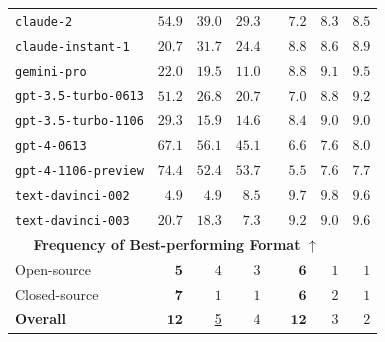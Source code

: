 \begin{table}[bpth]
\begin{minipage}{0.58\textwidth}
\begin{adjustbox}{max width=\textwidth}
\begin{tabular}{@{} l rrr  m{0.01em}  rrr @{}}
\texttt{claude-2}                  &     $\mathbf{54.9}$ &  \underline{$39.0$} &              $29.3$ &&     $\mathbf{7.2}$ &   \underline{$8.3$} &               $8.5$ \\
\texttt{claude-instant-1}          &              $20.7$ &     $\mathbf{31.7}$ &  \underline{$24.4$} &&  \underline{$8.8$} &      $\mathbf{8.6}$ &               $8.9$ \\
\texttt{gemini-pro}                &     $\mathbf{22.0}$ &  \underline{$19.5$} &              $11.0$ &&     $\mathbf{8.8}$ &   \underline{$9.1$} &               $9.5$ \\
\texttt{gpt-3.5-turbo-0613}        &     $\mathbf{51.2}$ &  \underline{$26.8$} &              $20.7$ &&     $\mathbf{7.0}$ &   \underline{$8.8$} &               $9.2$ \\
\texttt{gpt-3.5-turbo-1106}        &     $\mathbf{29.3}$ &  \underline{$15.9$} &              $14.6$ &&     $\mathbf{8.4}$ &   \underline{$9.0$} &   \underline{$9.0$} \\
\texttt{gpt-4-0613}                &     $\mathbf{67.1}$ &  \underline{$56.1$} &              $45.1$ &&     $\mathbf{6.6}$ &   \underline{$7.6$} &               $8.0$ \\
\texttt{gpt-4-1106-preview}        &     $\mathbf{74.4}$ &              $52.4$ &  \underline{$53.7$} &&     $\mathbf{5.5}$ &   \underline{$7.6$} &               $7.7$ \\
\texttt{text-davinci-002}          &   \underline{$4.9$} &   \underline{$4.9$} &      $\mathbf{8.5}$ &&  \underline{$9.7$} &               $9.8$ &      $\mathbf{9.6}$ \\
\texttt{text-davinci-003}          &     $\mathbf{20.7}$ &  \underline{$18.3$} &               $7.3$ &&  \underline{$9.2$} &      $\mathbf{9.0}$ &               $9.6$ \\

\midrule
\multicolumn{7}{c}{\textbf{Frequency of Best-performing Format} $\uparrow$} \\
Open-source & $\mathbf{5}$ & \underline{$4$} & $3$ && $\mathbf{6}$ & \underline{$1$} & \underline{$1$} \\

Closed-source & $\mathbf{7}$ & \underline{$1$} & \underline{$1$} && $\mathbf{6}$ & \underline{$2$} & $1$ \\

\textbf{Overall} & $\mathbf{12}$ & \underline{5} & $4$ && $\mathbf{12}$ &  \underline{$3$} & $2$ \\


\bottomrule
\end{tabular}
\end{adjustbox}
\end{minipage}
\end{table}



